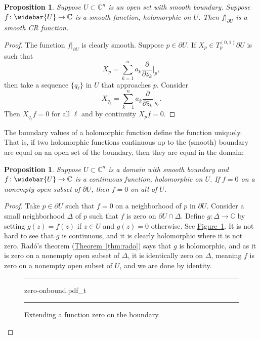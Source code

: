 \documentclass[12pt,openany]{book}
\newcommand{\C}{{\mathbb{C}}}
\theoremstyle{plain}
\newtheorem{prop}[thm]{Proposition}
\theoremstyle{remark}
\theoremstyle{definition}
\newenvironment{myfig}{%
\begin{figure}[h!t]
\noindent\rule{\textwidth}{0.5pt}\vspace{12pt}\par\centering}%
{\par\noindent\rule{\textwidth}{0.5pt}
\end{figure}}
\theoremstyle{exercise}
\theoremstyle{example}
\newcommand{\figureref}[1]{\hyperref[#1]{Figure~\ref*{#1}}}
\newcommand{\thmref}[1]{\hyperref[#1]{Theorem~\ref*{#1}}}
\begin{document}
\begin{prop} \label{prop:boundaryvaluesCR}
Suppose $U \subset \C^n$ is an open set with smooth boundary.  Suppose
$f \colon \widebar{U} \to \C$ is a smooth function, holomorphic on $U$.
Then $f|_{\partial U}$ is a smooth CR function.
\end{prop}

\begin{proof}
The function $f|_{\partial U}$ is clearly smooth.
Suppose $p \in \partial U$.
If $X_p \in T_p^{(0,1)} \partial U$ is such that
\begin{equation*}
X_p = \sum_{k=1}^n a_k \frac{\partial}{\partial \bar{z}_k} \Big|_p ,
\end{equation*}
then take a sequence $\{ q_\ell \}$ in $U$ that approaches $p$.  Consider
\begin{equation*}
X_{q_\ell} = \sum_{k=1}^n a_k \frac{\partial}{\partial \bar{z}_k}
\Big|_{q_\ell} .
\end{equation*}
Then $X_{q_\ell} f = 0$ for all $\ell$ and by continuity $X_p f = 0$.
\end{proof}

\pagebreak[2]
The boundary values of a holomorphic function define the function uniquely.
That is, if two holomorphic functions continuous up to the (smooth) boundary
are equal on an open set of the boundary, then they are equal in the domain:

\begin{prop} \label{prop:boundaryvaluesdeterminef}
Suppose $U \subset \C^n$ is a domain with smooth boundary and $f \colon
\widebar{U} \to \C$ is
a continuous function, holomorphic on $U$.  If $f=0$ on a nonempty open subset of $\partial
U$, then $f=0$ on all of $U$.
\end{prop}

\begin{proof}
Take $p \in \partial U$ such that $f=0$ on a neighborhood of $p$ in
$\partial U$.  Consider a small neighborhood $\Delta$ of $p$ such
that $f$ is zero on $\partial U \cap \Delta$.  Define $g \colon \Delta \to
\C$ by setting $g(z) = f(z)$ if $z \in U$ and $g(z) = 0$ otherwise.
See \figureref{fig:zero-onbound}.
It is not hard to see that $g$ is continuous, and it is clearly holomorphic
where it is not zero.  Rad{\'o}'s theorem
(\thmref{thm:rado}) says that $g$ is holomorphic, and as it is zero on a
nonempty open subset of $\Delta$, it is identically zero on $\Delta$,
meaning $f$ is zero on a nonempty open subset of $U$, and we are done by
identity.

\begin{myfig}
{zero-onbound.pdf_t}
\caption{Extending a function zero on the boundary.\label{fig:zero-onbound}}
\end{myfig}
\end{proof}
\end{document}
